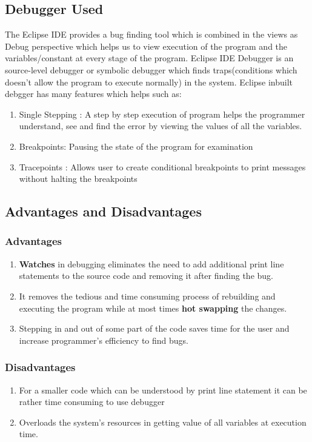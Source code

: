 \documentclass[a4paper, 11pt]{article}
\begin{document}
\subsection{Debugger Used}
The Eclipse IDE provides a bug finding tool which is combined in the views as Debug perspective which helps us to view execution of the program and the variables/constant at every stage of the program. Eclipse IDE Debugger is an source-level debugger or symbolic debugger which finds traps(conditions which doesn't allow the program to execute normally) in the system. Eclipse inbuilt debgger has many features which helps such as:
\begin{enumerate}
    \item Single Stepping : A step by step execution of program helps the programmer understand, see and find the error by viewing the values of all the variables.
    \item Breakpoints: Pausing the state of the program for examination 
    \item Tracepoints : Allows user to create conditional breakpoints to print messages without halting the breakpoints
\end{enumerate}
\subsection{Advantages and Disadvantages}
\subsubsection{Advantages}
\begin{enumerate}
    \item \textbf{Watches} in debugging eliminates the need to add additional print line statements to the source code and removing it after finding the bug.
    \item It removes the tedious and time consuming process of rebuilding and executing the program while at most times \textbf{hot swapping} the changes.
    \item Stepping in and out of some part of the code saves time for the user and increase programmer's efficiency to find bugs.
\end{enumerate}

\subsubsection{Disadvantages}
\begin{enumerate}
    \item For a smaller code which can be understood by print line statement it can be rather time consuming to use debugger
    \item Overloads the system's resources in getting value of all variables at execution time.
\end{enumerate}
\end{document}
